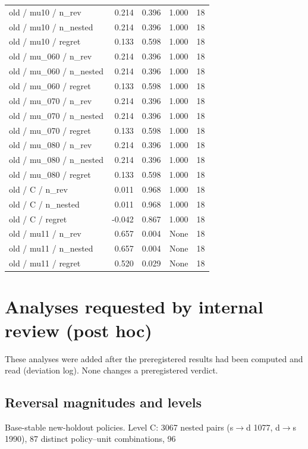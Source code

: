 \documentclass[10pt,a4paper]{article}
\begin{document}
{\begin{longtable}{lrrrr}
old / mu10 / n\_rev & 0.214 & 0.396 & 1.000 & 18 \\
old / mu10 / n\_nested & 0.214 & 0.396 & 1.000 & 18 \\
old / mu10 / regret & 0.133 & 0.598 & 1.000 & 18 \\
old / mu\_060 / n\_rev & 0.214 & 0.396 & 1.000 & 18 \\
old / mu\_060 / n\_nested & 0.214 & 0.396 & 1.000 & 18 \\
old / mu\_060 / regret & 0.133 & 0.598 & 1.000 & 18 \\
old / mu\_070 / n\_rev & 0.214 & 0.396 & 1.000 & 18 \\
old / mu\_070 / n\_nested & 0.214 & 0.396 & 1.000 & 18 \\
old / mu\_070 / regret & 0.133 & 0.598 & 1.000 & 18 \\
old / mu\_080 / n\_rev & 0.214 & 0.396 & 1.000 & 18 \\
old / mu\_080 / n\_nested & 0.214 & 0.396 & 1.000 & 18 \\
old / mu\_080 / regret & 0.133 & 0.598 & 1.000 & 18 \\
old / C / n\_rev & 0.011 & 0.968 & 1.000 & 18 \\
old / C / n\_nested & 0.011 & 0.968 & 1.000 & 18 \\
old / C / regret & -0.042 & 0.867 & 1.000 & 18 \\
old / mu11 / n\_rev & 0.657 & 0.004 & None & 18 \\
old / mu11 / n\_nested & 0.657 & 0.004 & None & 18 \\
old / mu11 / regret & 0.520 & 0.029 & None & 18 \\
\bottomrule
\end{longtable}}


\section{Analyses requested by internal review (post hoc)}
These analyses were added after the preregistered results had been computed and read (deviation log). None changes a preregistered verdict.

\subsection{Reversal magnitudes and levels}
Base-stable new-holdout policies. Level C: 3067 nested pairs (s$\to$d 1077, d$\to$s 1990), 87 distinct policy--unit combinations, 96%
\end{document}
